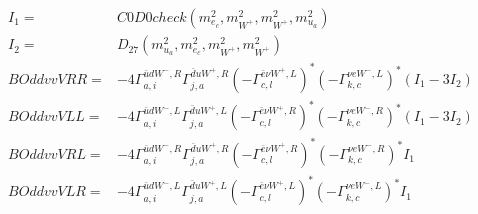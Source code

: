 \documentclass[A4,landscape]{article}
\begin{document}
\begin{align} 
I_1 = & C0D0check(m^2_{e_{{c}}}, m^2_{W^+}, m^2_{W^+}, m^2_{u_{{a}}}) \\ 
I_2 = & D_{27}(m^2_{u_{{a}}}, m^2_{e_{{c}}}, m^2_{W^+}, m^2_{W^+}) \\ 
  BOddvvVRR= & -4  \Gamma^{\bar{u}d W^-,R}_{a, i} \Gamma^{\bar{d}u W^+ ,R}_{j, a} (- \Gamma^{\bar{e}\nu W^+ ,L} _{c, l})^* (- \Gamma^{\nu e W^-,L} _{k, c})^* (I_1 - 3 I_2) \\ 
  BOddvvVLL= & -4  \Gamma^{\bar{u}d W^-,L}_{a, i} \Gamma^{\bar{d}u W^+ ,L}_{j, a} (- \Gamma^{\bar{e}\nu W^+ ,R} _{c, l})^* (- \Gamma^{\nu e W^-,R} _{k, c})^* (I_1 - 3 I_2) \\ 
  BOddvvVRL= & -4  \Gamma^{\bar{u}d W^-,R}_{a, i} \Gamma^{\bar{d}u W^+ ,R}_{j, a} (- \Gamma^{\bar{e}\nu W^+ ,R} _{c, l})^* (- \Gamma^{\nu e W^-,R} _{k, c})^* I_1 \\ 
  BOddvvVLR= & -4  \Gamma^{\bar{u}d W^-,L}_{a, i} \Gamma^{\bar{d}u W^+ ,L}_{j, a} (- \Gamma^{\bar{e}\nu W^+ ,L} _{c, l})^* (- \Gamma^{\nu e W^-,L} _{k, c})^* I_1 \\ 
\end{align} 
\end{document}
